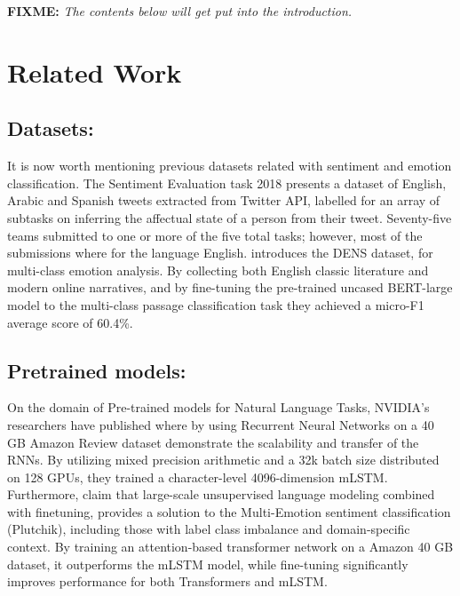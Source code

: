 \documentclass[11pt]{article}
\newcommand{\fixme}[1]{{\color{red} \textbf{FIXME:} {\textit {#1}}}}
\begin{document}

\newpage
\fixme{The contents below will get put into the introduction.}
\section{Related Work}
\label{sec:related}
\subsection{Datasets:}
It is now worth mentioning previous datasets related with sentiment and emotion classification. The Sentiment Evaluation task 2018 \cite{mohammad-etal-2018-semeval} presents a dataset of English, Arabic and Spanish tweets extracted from Twitter API, labelled for an array of subtasks on inferring the affectual state of a person from their tweet. Seventy-five teams submitted to one or more of the five total tasks; however, most of the submissions where for the language English. 
\cite{liu2019dens} introduces the DENS dataset, for multi-class emotion analysis. By collecting both English classic literature and modern online narratives, and by fine-tuning the pre-trained uncased BERT-large model to the multi-class passage classification task they achieved a micro-F1 average score of 60.4\%.

\subsection{Pretrained models:}
On the domain of Pre-trained models for Natural Language Tasks, NVIDIA's researchers have published 
\cite{puri2018large} where by using Recurrent Neural Networks on a 40 GB Amazon Review dataset demonstrate 
the scalability and transfer of the RNNs. By utilizing mixed precision arithmetic and 
a 32k batch size distributed on 128 GPUs, they trained a character-level 4096-dimension mLSTM.
Furthermore, \cite{kant2018practical} claim that large-scale unsupervised language modeling combined 
with finetuning, provides a solution to the Multi-Emotion sentiment classification (Plutchik),
including those with label class imbalance and domain-specific context. By training an attention-based
transformer network on a Amazon 40 GB dataset, it outperforms the mLSTM model, while fine-tuning significantly 
improves performance for both Transformers and mLSTM.
\end{document}
